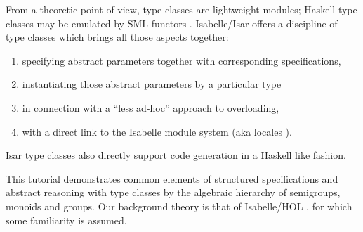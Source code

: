 \begin{isabellebody}
\begin{isamarkuptext}
  \noindent From a theoretic point of view, type classes are lightweight
  modules; Haskell type classes may be emulated by
  SML functors \cite{classes_modules}. 
  Isabelle/Isar offers a discipline of type classes which brings
  all those aspects together:

  \begin{enumerate}
    \item specifying abstract parameters together with
       corresponding specifications,
    \item instantiating those abstract parameters by a particular
       type
    \item in connection with a ``less ad-hoc'' approach to overloading,
    \item with a direct link to the Isabelle module system
      (aka locales \cite{kammueller-locales}).
  \end{enumerate}

  \noindent Isar type classes also directly support code generation
  in a Haskell like fashion.

  This tutorial demonstrates common elements of structured specifications
  and abstract reasoning with type classes by the algebraic hierarchy of
  semigroups, monoids and groups.  Our background theory is that of
  Isabelle/HOL \cite{isa-tutorial}, for which some
  familiarity is assumed.


\end{isamarkuptext}
\end{isabellebody}
